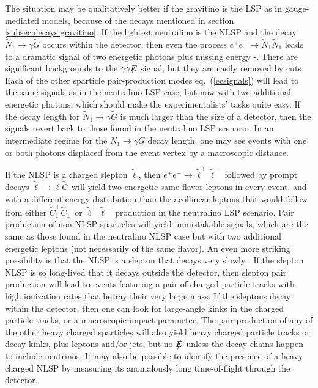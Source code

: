 \documentclass[11pt]{article}
\def\stilde{\widetilde}
\def\G{\stilde G}
\def\NI{\stilde N_1}
\def\Etot{{\slashchar{E}}}
\def\slashchar#1{\setbox0=\hbox{$#1$}           %
   \dimen0=\wd0                                 %
   \setbox1=\hbox{/} \dimen1=\wd1               %
   \ifdim\dimen0>\dimen1                        %
      \rlap{\hbox to \dimen0{\hfil/\hfil}}      %
      #1                                        %
   \else                                        %
      \rlap{\hbox to \dimen1{\hfil$#1$\hfil}}   %
      /                                         %
   \fi}                                        %
\begin{document}
The situation may be qualitatively better if the 
gravitino is the LSP as in gauge-mediated models, because of the decays 
mentioned in section \ref{subsec:decays.gravitino}. If the lightest 
neutralino is the NLSP and the decay $\NI\rightarrow\gamma\G$ occurs 
within the detector, then even the process $e^+e^-\rightarrow \NI\NI$ 
leads to a dramatic signal of two energetic photons plus missing energy 
\cite{eeGMSBsignal}-\cite{AKKMM2}. 
There are significant backgrounds to the 
$\gamma\gamma\Etot$ signal, but they are easily removed by cuts. Each of 
the other sparticle pair-production modes eq.~(\ref{eesignals}) will lead 
to the same signals as in the neutralino LSP case, but now with two 
additional energetic photons, which should make the experimentalists' 
tasks quite easy. If the decay length for $\NI\rightarrow\gamma\G$ is much 
larger than the size of a detector, then the signals revert back to those 
found in the neutralino LSP scenario. In an intermediate regime for the 
$\NI\rightarrow\gamma\G$ decay length, one may see events with one or both 
photons displaced from the event vertex by a macroscopic distance.

If the NLSP is a charged slepton $\stilde \ell$, then $e^+e^-\rightarrow 
\stilde \ell^+\stilde \ell^-$ followed by prompt decays $\stilde 
\ell\rightarrow \ell \G$ will yield two energetic same-flavor leptons in 
every event, and with a different energy distribution than the acollinear 
leptons that would follow from either $\stilde C_1^+\stilde C_1^-$ or 
$\stilde \ell^+\stilde \ell^-$ production in the neutralino LSP scenario. 
Pair production of non-NLSP sparticles will yield unmistakable signals, 
which are the same as those found in the neutralino NLSP case but with two 
additional energetic leptons (not necessarily of the same flavor). An even 
more striking possibility is that the NLSP is a slepton that decays very 
slowly \cite{DDRT}. If the slepton NLSP is so long-lived that it decays 
outside the detector, then slepton pair production will lead to events 
featuring a pair of charged particle tracks with high ionization rates 
that betray their very large mass. If the sleptons decay within the 
detector, then one can look for large-angle
kinks in the charged particle tracks, or a 
macroscopic impact parameter. The pair production of any of the other 
heavy charged sparticles will also yield heavy charged particle tracks or 
decay kinks, plus leptons and/or jets, but no $\Etot$ unless the decay 
chains happen to include neutrinos. It may also be possible to identify 
the presence of a heavy charged NLSP by measuring its anomalously long 
time-of-flight through the detector.
\end{document}
